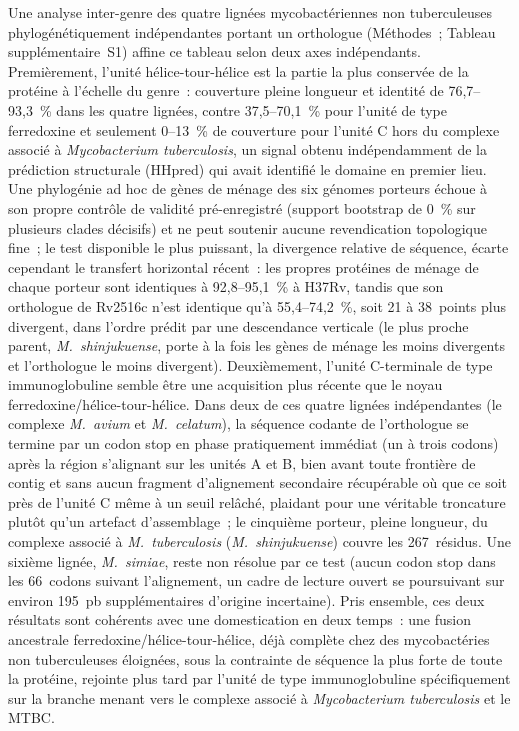 \documentclass[11pt,a4paper]{article}
\newcommand{\mtb}{\textit{Mycobacterium tuberculosis}}
\begin{document}
Une analyse inter-genre des quatre lignées mycobactériennes non tuberculeuses phylogénétiquement
indépendantes portant un orthologue (Méthodes~; Tableau supplémentaire~S1) affine ce tableau selon deux axes indépendants.
Premièrement, l'unité hélice-tour-hélice est la partie la plus conservée de la protéine à l'échelle
du genre~: couverture pleine longueur et identité de 76,7--93,3~\% dans les quatre lignées, contre
37,5--70,1~\% pour l'unité de type ferredoxine et seulement 0--13~\% de couverture pour l'unité C
hors du complexe associé à \mtb{}, un signal obtenu indépendamment de la prédiction structurale
(HHpred) qui avait identifié le domaine en premier lieu. Une phylogénie ad hoc de gènes de ménage
des six génomes porteurs échoue à son propre contrôle de validité pré-enregistré (support bootstrap
de 0~\% sur plusieurs clades décisifs) et ne peut soutenir aucune revendication topologique fine~;
le test disponible le plus puissant, la divergence relative de séquence, écarte cependant le
transfert horizontal récent~: les propres protéines de ménage de chaque porteur sont identiques à
92,8--95,1~\% à H37Rv, tandis que son orthologue de Rv2516c n'est identique qu'à 55,4--74,2~\%, soit
21 à 38~points plus divergent, dans l'ordre prédit par une descendance verticale (le plus proche
parent, \textit{M.\ shinjukuense}, porte à la fois les gènes de ménage les moins divergents et
l'orthologue le moins divergent). Deuxièmement, l'unité C-terminale de type immunoglobuline semble
être une acquisition plus récente que le noyau ferredoxine/hélice-tour-hélice. Dans deux de ces
quatre lignées indépendantes (le complexe \textit{M.\ avium} et \textit{M.\ celatum}), la séquence
codante de l'orthologue se termine par un codon stop en phase pratiquement immédiat (un à trois
codons) après la région s'alignant sur les unités A et B, bien avant toute frontière de contig et
sans aucun fragment d'alignement secondaire récupérable où que ce soit près de l'unité C même à un
seuil relâché, plaidant pour une véritable troncature plutôt qu'un artefact d'assemblage~; le
cinquième porteur, pleine longueur, du complexe associé à \textit{M.\ tuberculosis}
(\textit{M.\ shinjukuense}) couvre les 267~résidus. Une sixième lignée, \textit{M.\ simiae}, reste
non résolue par ce test (aucun codon stop dans les 66~codons suivant l'alignement, un cadre de
lecture ouvert se poursuivant sur environ 195~pb supplémentaires d'origine incertaine). Pris
ensemble, ces deux résultats sont cohérents avec une domestication en deux temps~: une fusion
ancestrale ferredoxine/hélice-tour-hélice, déjà complète chez des mycobactéries non tuberculeuses
éloignées, sous la contrainte de séquence la plus forte de toute la protéine, rejointe plus tard par
l'unité de type immunoglobuline spécifiquement sur la branche menant vers le complexe associé à
\mtb{} et le MTBC.
\end{document}
